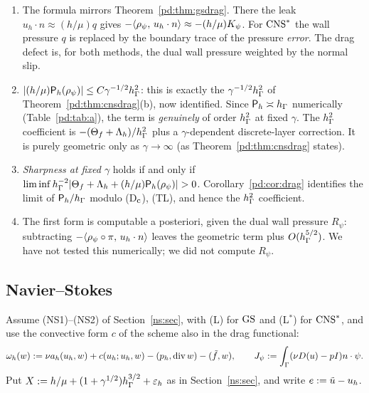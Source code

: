 \begin{remark}[Consequences]\label{pd:rem:B2}
\begin{enumerate}
\item The formula mirrors Theorem~\ref{pd:thm:gsdrag}. There the leak $u_h\cdot n\approx(h/\mu)q$ gives $-\langle \rho_\psi,\, u_h\cdot n\rangle\approx-(h/\mu)K_\psi$. For $\mathrm{CNS}^\ast$ the wall pressure $q$ is replaced by the boundary trace of the pressure \emph{error}. The drag defect is, for both methods, the dual wall pressure weighted by the normal slip.
\item $|(h/\mu)\mathsf P_h(\rho_\psi)|\le C\gamma^{-1/2}h_\Gamma^2$: this is exactly the $\gamma^{-1/2}h_\Gamma^2$ of Theorem~\ref{pd:thm:cnsdrag}(b), now identified. Since $\mathsf P_h\asymp h_\Gamma$ numerically (Table~\ref{pd:tab:a}), the term is \emph{genuinely} of order $h_\Gamma^2$ at fixed $\gamma$. The $h_\Gamma^2$ coefficient is $-(\Theta_f+\Lambda_h)/h_\Gamma^2$ plus a $\gamma$-dependent discrete-layer correction. It is purely geometric only as $\gamma\to\infty$ (as Theorem~\ref{pd:thm:cnsdrag} states). 
\item \emph{Sharpness at fixed $\gamma$} holds if and only if $\liminf\hG^{-2}|\Theta_f+\Lambda_h+(h/\mu)\Pm(\rho_\psi)|>0$. Corollary~\ref{pd:cor:drag} identifies the limit of $\mathsf P_h/h_\Gamma$ modulo (D$_{\rm c}$), (TL), and hence the $h_\Gamma^2$ coefficient.
\item The first form is computable a posteriori, given the dual wall pressure $R_\psi$: subtracting $-\langle \rho_\psi\circ\pi,\, u_h\cdot n\rangle$ leaves the geometric term plus $O(h_\Gamma^{5/2})$. We have not tested this numerically; we did not compute $R_\psi$.
\end{enumerate}
\end{remark}


\subsection{Navier--Stokes}\label{pd:sec:ns}

Assume (NS1)--(NS2) of Section~\ref{ns:sec}, with (L) for $\mathrm{GS}$ and (L$^\ast$) for $\mathrm{CNS}^\ast$, and use the convective form $c$ of the scheme also in the drag functional:
\[
\omega_h(w):=\nu a_h(u_h,w)+c(u_h;u_h,w)-(p_h,\operatorname{div} w)-(\tilde f,w),\qquad J_\psi:=\int_\Gamma(\nu D(u)-pI)n\cdot\psi .
\]
Put $X:=h/\mu+(1+\gamma^{1/2})h_\Gamma^{3/2}+\varepsilon_h$ as in Section~\ref{ns:sec}, and write $e:=\tilde u-u_h$.

